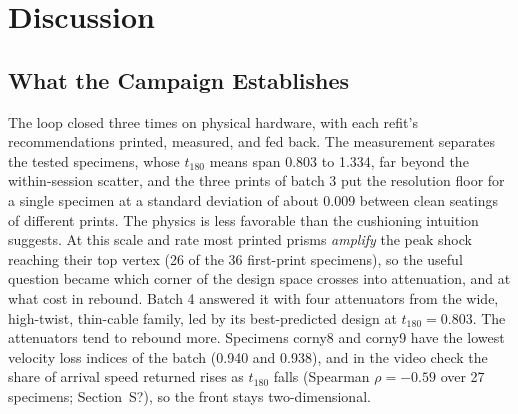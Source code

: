 \documentclass[11pt]{article}
\providecommand{\siref}[1]{S?}
\begin{document}
\section{Discussion}
\label{sec:discussion}

\subsection{What the Campaign Establishes}
The loop closed three times on physical hardware, with each refit's
recommendations printed, measured, and fed back. The measurement
separates the tested specimens, whose $t_{180}$ means span 0.803 to
1.334, far beyond the within-session scatter, and the three prints of
batch 3 put the resolution floor for a single specimen at a standard
deviation of about 0.009 between clean seatings of different prints. The
physics is less favorable than the cushioning intuition suggests. At this
scale and rate most printed prisms \emph{amplify} the peak shock reaching
their top vertex (26 of the 36 first-print specimens), so the useful question became
which corner of the design space crosses into attenuation, and at what
cost in rebound. Batch 4 answered it with four attenuators from the wide,
high-twist, thin-cable family, led by its best-predicted design at
$t_{180} = 0.803$. The attenuators tend to rebound more. Specimens corny8 and
corny9 have the lowest velocity loss indices of the batch (0.940 and
0.938), and in the video check the share of arrival speed returned rises
as $t_{180}$ falls (Spearman $\rho = -0.59$ over 27 specimens;
Section~\siref{si:rebound}), so the front stays two-dimensional.
\end{document}
